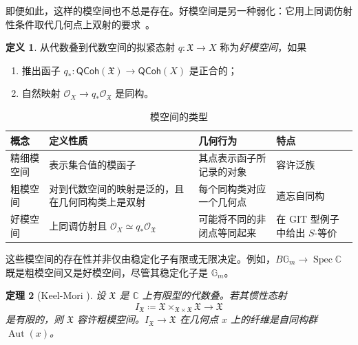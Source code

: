 \documentclass{amsart}
\newtheorem{thm}{定理}[section]
\theoremstyle{definition}
\newtheorem{defn}[thm]{定义}
\theoremstyle{remark}
\theoremstyle{plain}
\theoremstyle{definition}
\theoremstyle{remark}
\newcommand{\G}{\mathbb{G}}
\newcommand{\C}{\mathbb{C}}
\newcommand{\mc}[1]{\mathcal{#1}}
\newcommand{\mf}[1]{\mathfrak{#1}}
\newcommand{\on}[1]{\operatorname{#1}}
\newcommand{\ms}[1]{\mathsf{#1}}
\newcommand{\1}{\mathbf{1}}
\newcommand{\2}{\mathbf{2}}
\newcommand{\3}{\mathbf{3}}
\begin{document}
即便如此，这样的模空间也不总是存在。好模空间是另一种弱化：它用上同调仿射性条件取代几何点上双射的要求~\cite{Alper2013}。

\begin{defn}
    从代数叠到代数空间的拟紧态射 \(q\colon\mf{X}\to X\) 称为\textit{好模空间}，如果
    \begin{enumerate}
        \item 推出函子 \(q_*\colon\ms{QCoh}(\mf{X})\to\ms{QCoh}(X)\) 是正合的；
        \item 自然映射 \(\mc{O}_X\to q_*\mc{O}_{\mf{X}}\) 是同构。
    \end{enumerate}
\end{defn}

\begin{table}[htpb]
    \centering
    \caption{模空间的类型}
    \label{tab:moduli-types-corrected}
    \renewcommand{\arraystretch}{1.3}
    \begin{tabular}{
        p{}
        p{}
        p{}
        p{}
    }
        \toprule
        \textbf{概念}
        & \textbf{定义性质}
        & \textbf{几何行为}
        & \textbf{特点}
        \\
        \midrule
        精细模空间
        & 表示集合值的模函子
        & 其点表示函子所记录的对象
        & 容许泛族
        \\
        粗模空间
        & 对到代数空间的映射是泛的，且在几何同构类上是双射
        & 每个同构类对应一个几何点
        & 遗忘自同构
        \\
        好模空间
        & 上同调仿射且
          \(\mc{O}_X \simeq q_*\mc{O}_{\mf{X}}\)
        & 可能将不同的非闭点等同起来
        & 在 GIT 型例子中给出 \(S\)-等价
        \\
        \bottomrule
    \end{tabular}
\end{table}

这些模空间的存在性并非仅由稳定化子有限或无限决定。例如，\(B\G_m\to\on{Spec}\C\) 既是粗模空间又是好模空间，尽管其稳定化子是 \(\G_m\)。

\begin{thm}[Keel-Mori {\cite{KeelMori1997}}]
    设 \(\mf{X}\) 是 \(\C\) 上有限型的代数叠。若其惯性态射
    \[
        I_{\mf{X}}
        \coloneqq
        \mf{X}\times_{\mf{X}\times\mf{X}}\mf{X}
        \longrightarrow \mf{X}
    \]
    是有限的，则 \(\mf{X}\) 容许粗模空间。\(I_{\mf{X}}\to\mf{X}\) 在几何点 \(x\) 上的纤维是自同构群 \(\on{Aut}(x)\)。
\end{thm}
\end{document}
